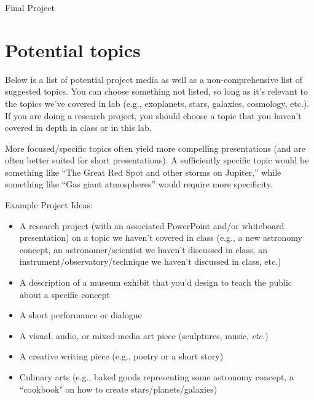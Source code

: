 \documentclass[12pt]{article}
\begin{document}
\thispagestyle{empty}

\begin{center}
\huge{Final Project}\\ \medskip 
\end{center}


\section{Potential topics}
 \noindent
 Below is a list of potential project media as well as a non-comprehensive list of suggested topics.  You can choose something not listed, so long as it's relevant to the topics we've covered in lab (e.g., exoplanets, stars, galaxies, cosmology, etc.). If you are doing a research project, you should choose a topic that you haven't covered in depth in class or in this lab.

\medskip \noindent
More focused/specific topics often yield more compelling presentations (and are often better suited for short presentations). A sufficiently specific topic would be something like ``The Great Red Spot and other storms on Jupiter,'' while something like ``Gas giant atmospheres'' would require more specificity.

\bigskip \noindent
Example Project Ideas:
\begin{itemize}[noitemsep]
    \item A research project (with an associated PowerPoint and/or whiteboard presentation) on a topic we haven't covered in class (e.g., a new astronomy concept, an astronomer/scientist we haven’t discussed in class, an instrument/observatory/technique we haven’t discussed in class, etc.)
    \item A description of a museum exhibit that you'd design to teach the public about a specific concept
    \item A short performance or dialogue
    \item A visual, audio, or mixed-media art piece (sculptures, music, \textit{etc.})
    \item A creative writing piece (e.g., poetry or a short story)
    \item Culinary arts (e.g., baked goods representing some astronomy concept, a ``cookbook" on how to create stars/planets/galaxies)

\end{itemize}
\end{document}
